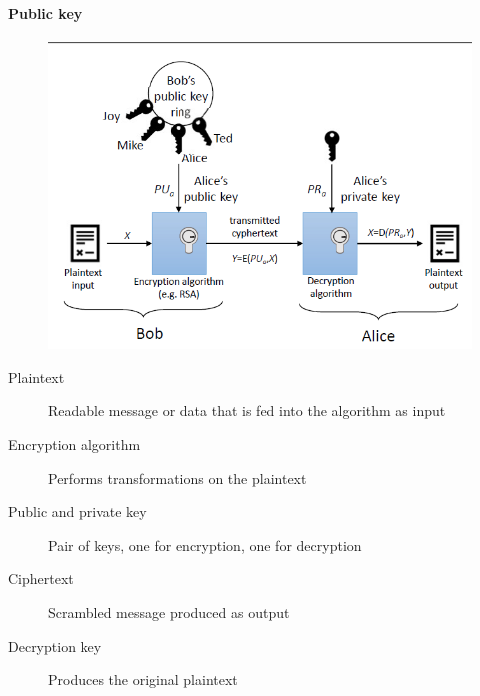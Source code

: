 \documentclass{article}
\begin{document}
                                \paragraph{Public key}
                                    \begin{figure}
                                        \begin{center}
                                            \includegraphics{../immagini/public_key.png}
                                        \end{center}
                                    \end{figure}
                                    \begin{description}
                                        \item[Plaintext] Readable message or data that is fed into the algorithm as input
                                        \item[Encryption algorithm] Performs transformations on the plaintext
                                        \item[Public and private key] Pair of keys, one for encryption, one for decryption
                                        \item[Ciphertext] Scrambled message produced as output
                                        \item[Decryption key] Produces the original plaintext
                                    \end{description}
\end{document}
